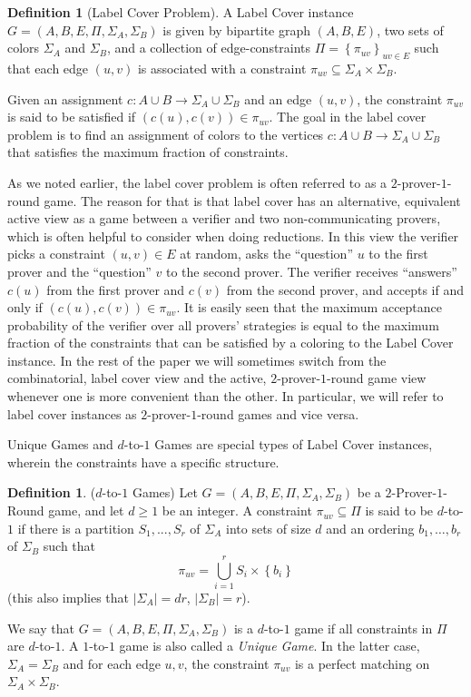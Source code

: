 \documentclass[11pt]{article}
\numberwithin{equation}{section}
\theoremstyle{definition}
\newtheorem{definition}[theorem]{Definition}
\theoremstyle{plain}
\newcommand\card[1]{\left| {#1} \right|}
\newcommand\set[1]{{\left\{ #1 \right\}}}
\renewcommand\subset{\subseteq}
\begin{document}
\begin{definition}[Label Cover Problem]%
  A Label Cover instance $G=(A,B,E,\Pi,\Sigma_A,\Sigma_B)$
  is given by bipartite graph $(A,B,E)$, two sets of colors $\Sigma_A$
  and $\Sigma_B$, and a collection of edge-constraints
  $\Pi = \set{\pi_{uv}}_{uv\in E}$ such that each edge $(u,v)$ is
  associated with a constraint
  $\pi_{uv} \subset \Sigma_A\times \Sigma_B$.

  Given an assignment $c: A \cup B \to \Sigma_A\cup \Sigma_B $ and an
  edge $(u,v)$, the constraint $\pi_{uv}$ is said to be satisfied if
  $(c(u), c(v))\in \pi_{uv}$. The goal in the label cover problem
  is to find an assignment of colors to the vertices
  $c: A \cup B \to \Sigma_A\cup \Sigma_B $ that  satisfies the
  maximum fraction of  constraints.
\end{definition}

As we noted earlier, the label cover problem is often referred to as a $2$-prover-$1$-round game.
The reason for that is that label cover has an alternative, equivalent active view as a game between
a verifier and two non-communicating provers, which is often helpful to consider when doing reductions.
In this view the verifier picks a constraint
$(u,v)\in E$ at random, asks the ``question'' $u$ to the first prover and
the ``question'' $v$ to the second prover. The verifier receives ``answers''
$c(u)$ from the first prover and $c(v)$ from the second prover, and accepts if and only if
$(c(u), c(v)) \in \pi_{uv}$. It is easily seen that the maximum acceptance probability of the
verifier over all provers' strategies is equal to the maximum
fraction of the constraints that can be satisfied by a coloring to the
Label Cover instance. In the rest of the paper we will sometimes switch from the combinatorial,
label cover view and the active, $2$-prover-$1$-round game view whenever one is more convenient than
the other. In particular, we will refer to label cover
instances as $2$-prover-$1$-round games and vice versa.

Unique Games and $d$-to-$1$ Games are special types of Label Cover instances, 
wherein the constraints have a specific structure.
\begin{definition}($d$-to-$1$ Games) Let $G=(A,B,E,\Pi,\Sigma_A,\Sigma_B)$ be a
  $2$-Prover-$1$-Round game, and
    let $d \geqslant 1$ be an integer. A constraint
  $\pi_{uv} \subseteq \Pi$ is said to be
  $d$-to-$1$  if there is a partition $S_1,...,S_r$ of
  $\Sigma_A$ into sets of size $d$ and an ordering $b_1,\ldots,b_r$ of\/
  $\Sigma_B$  such that
\[
\pi_{uv}=\bigcup\limits_{i=1}^r{S_i\times \set{b_i}}
\]
 (this also implies that $|\Sigma_A| = dr$, $\card{\Sigma_B}=r$).

We say that  $G=(A,B,E,\Pi,\Sigma_A,\Sigma_B)$ is  a $d$-to-$1$
game if all constraints in $\Pi$ are $d$-to-$1$.
A $1$-to-$1$ game is also called a {\em Unique Game}. In the latter case,
$\Sigma_A = \Sigma_B$ and for each edge $u,v$, the constraint $\pi_{uv}$ is  a perfect matching on $\Sigma_A \times \Sigma_B$.
\end{definition}
\end{document}
